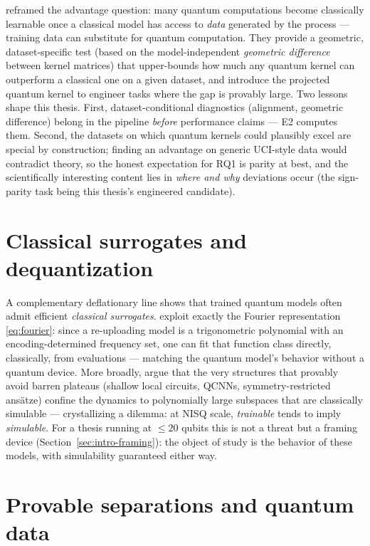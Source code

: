 \citet{huang2021power} reframed the advantage question: many quantum
computations become classically learnable once a classical model has access
to \emph{data} generated by the process --- training data can substitute for
quantum computation. They provide a geometric, dataset-specific test (based on
the model-independent \emph{geometric difference} between kernel matrices)
that upper-bounds how much any quantum kernel can outperform a classical one
on a given dataset, and introduce the projected quantum kernel to engineer
tasks where the gap is provably large. Two lessons shape this thesis. First,
dataset-conditional diagnostics (alignment, geometric difference) belong in
the pipeline \emph{before} performance claims --- E2 computes them. Second,
the datasets on which quantum kernels could plausibly excel are special by
construction; finding an advantage on generic UCI-style data would contradict
theory, so the honest expectation for RQ1 is parity at best, and the
scientifically interesting content lies in \emph{where and why} deviations
occur (the sign-parity task being this thesis's engineered candidate).

\section{Classical surrogates and dequantization}
\label{sec:related-surrogates}

A complementary deflationary line shows that trained quantum models often
admit efficient \emph{classical surrogates}. \citet{schreiber2023surrogates}
exploit exactly the Fourier representation \eqref{eq:fourier}: since a
re-uploading model is a trigonometric polynomial with an
encoding-determined frequency set, one can fit that function class directly,
classically, from evaluations --- matching the quantum model's behavior
without a quantum device. More broadly, \citet{cerezo2023simulability} argue
that the very structures that provably avoid barren plateaus (shallow local
circuits, QCNNs, symmetry-restricted ansätze) confine the dynamics to
polynomially large subspaces that are classically simulable --- crystallizing
a dilemma: at NISQ scale, \emph{trainable} tends to imply \emph{simulable}.
For a thesis running at $\le 20$ qubits this is not a threat but a framing
device (Section~\ref{sec:intro-framing}): the object of study is the behavior
of these models, with simulability guaranteed either way.

\section{Provable separations and quantum data}
\label{sec:related-separations}

